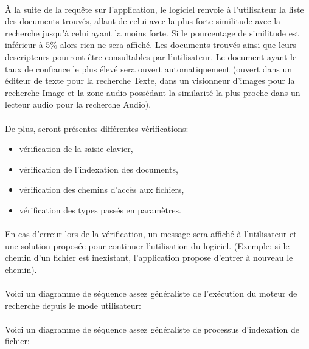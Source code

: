 \documentclass[../main.tex]{subfiles}
\begin{document}
    \paragraph{}
    À la suite de la requête sur l’application, le logiciel renvoie à l’utilisateur la liste des documents trouvés, allant de celui avec la plus forte similitude avec la recherche jusqu’à celui ayant la moins forte. Si le pourcentage de similitude est inférieur à 5\% alors rien ne sera affiché. Les documents trouvés ainsi que leurs descripteurs pourront être consultables par l’utilisateur. Le document ayant le taux de confiance le plus élevé sera ouvert automatiquement (ouvert dans un éditeur de texte pour la recherche Texte, dans un visionneur d’images pour la recherche Image et la zone audio possédant la similarité la plus proche dans un lecteur audio pour la recherche Audio).

    \paragraph{}
    De plus, seront présentes différentes vérifications:
    \begin{itemize}
        \item vérification de la saisie clavier,
        \item vérification de l’indexation des documents,
        \item vérification des chemins d’accès aux fichiers,
        \item vérification des types passés en paramètres.
    \end{itemize}

    \paragraph{}
    En cas d’erreur lors de la vérification, un message sera affiché à l’utilisateur et une solution proposée pour continuer l’utilisation du logiciel. (Exemple: si le chemin d’un fichier est inexistant, l’application propose d’entrer à nouveau le chemin).

    \paragraph{}
    Voici un diagramme de séquence assez généraliste de l’exécution du moteur de recherche depuis le mode utilisateur:

    \paragraph{}
    Voici un diagramme de séquence assez généraliste de processus d’indexation de fichier:
\end{document}
